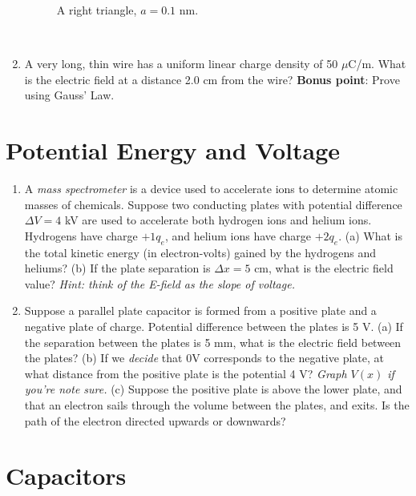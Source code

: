 \documentclass[10pt]{article}
\begin{document}
\begin{enumerate}
\begin{figure}[ht]
\caption{\label{fig:tri} A right triangle, $a = 0.1$ nm.}
\end{figure} \\ \vspace{1cm}
\item A very long, thin wire has a uniform linear charge density of 50 $\mu$C/m.  What is the electric field at a distance 2.0 cm from the wire?  \textbf{Bonus point}: Prove using Gauss' Law.  \\ \vspace{2cm}
\end{enumerate}

\section{Potential Energy and Voltage}

\begin{enumerate}
\item A \textit{mass spectrometer} is a device used to accelerate ions to determine atomic masses of chemicals.  Suppose two conducting plates with potential difference $\Delta V = 4$ kV are used to accelerate both hydrogen ions and helium ions.  Hydrogens have charge $+1 q_e$, and helium ions have charge $+2 q_e$.  (a) What is the total kinetic energy (in electron-volts) gained by the hydrogens and heliums? (b) If the plate separation is $\Delta x = 5$ cm, what is the electric field value?  \textit{Hint: think of the E-field as the slope of voltage.} \\ \vspace{3cm}
\item Suppose a parallel plate capacitor is formed from a positive plate and a negative plate of charge.  Potential difference between the plates is 5 V.  (a) If the separation between the plates is 5 mm, what is the electric field between the plates? (b) If we \textit{decide} that 0V corresponds to the negative plate, at what distance from the positive plate is the potential 4 V?  \textit{Graph $V(x)$ if you're note sure.} (c) Suppose the positive plate is above the lower plate, and that an electron sails through the volume between the plates, and exits.  Is the path of the electron directed upwards or downwards? \\ \vspace{3.5cm}
\end{enumerate}

\section{Capacitors}
\end{document}
